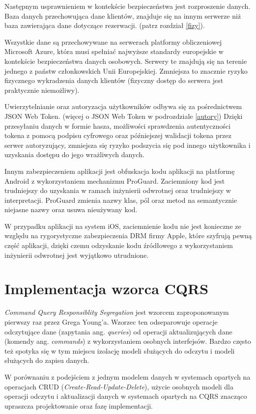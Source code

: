 Następnym usprawnieniem w kontekście bezpieczeństwa jest rozproszenie danych. Baza danych przechowująca dane klientów, znajduje się na innym serwerze niż baza zawierająca dane dotyczące rezerwacji. (patrz rozdział \ref{fizy}).

Wszystkie dane są przechowywane na serwerach platformy obliczeniowej Microsoft Azure, która musi spełniać najwyższe standardy europejskie w kontekście bezpieczeństwa danych osobowych. Serwery te znajdują się na terenie jednego z państw członkowskich Unii Europejskiej. Zmniejsza to znacznie ryzyko fizycznego wykradzenia danych klientów (fizyczny dostęp do serwera jest praktycznie niemożliwy).

Uwierzytelnianie oraz autoryzacja użytkowników odbywa się za pośrednictwem JSON Web Token. (więcej o JSON Web Token w podrozdziale \ref{autory}) Dzięki przesyłaniu danych w formie hasza, możliwości sprawdzenia autentyczności tokena z pomocą podpisu cyfrowego oraz późniejszej walidacji tokena przez serwer autoryzujący, zmniejsza się ryzyko podszycia się pod innego użytkownika i uzyskania dostępu do jego wrażliwych danych.

Innym zabezpieczeniem aplikacji jest obfuskacja kodu aplikacji na platformę Android z wykorzystaniem mechanizmu ProGuard. Zaciemniony kod jest trudniejszy do uzyskania w ramach inżynierii odwrotnej oraz trudniejszy w interpretacji. ProGuard zmienia nazwy klas, pól oraz metod na semantycznie niejasne nazwy oraz usuwa nieużywany kod.

W przypadku aplikacji na system iOS, zaciemnienie kodu nie jest konieczne ze względu na rygorystyczne zabezpieczenia DRM firmy Apple, które szyfrują pewną część aplikacji, dzięki czemu odzyskanie kodu źródłowego z wykorzystaniem inżynierii odwrotnej jest wyjątkowo utrudnione.
\newpage
\section{Implementacja wzorca CQRS}
\label{sec:cqrs}
\textit{Command Query Responsiblity Segregation} jest wzorcem zaproponowanym pierwszy raz przez Grega Young'a. Wzorzec ten odseparowuje operacje odczytujące dane (zapytania ang. \textit{queries}) od operacji aktualizujących dane (komendy ang. \textit{commands}) z wykorzystaniem osobnych interfejsów. Bardzo często też spotyka się w tym miejscu izolację modeli służących do odczytu i modeli służących do zapisu danych.

W porównaniu z podejściem z jednym modelem danych w systemach opartych na operacjach CRUD (\textit{Create-Read-Update-Delete}), użycie osobnych modeli dla operacji odczytu i aktualizacji danych w systemach opartych na CQRS znacząco upraszcza projektowanie oraz fazę implementacji. 

